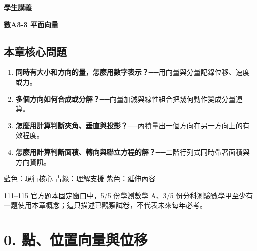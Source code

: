 \documentclass[11pt,a4paper]{article}
\providecommand{\tightlist}{%
  \setlength{\itemsep}{0pt}\setlength{\parskip}{0pt}}
\begin{document}
\begin{tcolorbox}[
  enhanced,colback=white,colframe=HandoutBlue,boxrule=1.1pt,arc=2mm,
  borderline west={3pt}{0pt}{HandoutBlue},left=5mm,right=4mm,top=4mm,bottom=4mm
]
{\sffamily\small\bfseries\color{HandoutBlue}學生講義}\par
{\sffamily\bfseries\LARGE\color{HandoutInk}數A3-3 平面向量}\par
\vspace{0.35em}{\large 把方向變成可運算的分量，再用內積與行列式讀角度和面積}\par
{}\par
{}\par
\end{tcolorbox}


\begin{HandoutLearningMap}

\subsection{本章核心問題}\label{ux672cux7ae0ux6838ux5fc3ux554fux984c}

\begin{enumerate}
\def\labelenumi{\arabic{enumi}.}
\tightlist
\item
  \textbf{同時有大小和方向的量，怎麼用數字表示？}──用向量與分量記錄位移、速度或力。
\item
  \textbf{多個方向如何合成或分解？}──向量加減與線性組合把幾何動作變成分量運算。
\item
  \textbf{怎麼用計算判斷夾角、垂直與投影？}──內積量出一個方向在另一方向上的有效程度。
\item
  \textbf{怎麼用計算判斷面積、轉向與聯立方程的解？}──二階行列式同時帶著面積與方向資訊。
\end{enumerate}

{藍色：現行核心}
{青綠：理解支援}
{紫色：延伸內容}

111--115 官方題本固定窗口中，5/5 份學測數學 A、3/5 份分科測驗數學甲至少有一題使用本章概念；這只描述已觀察試卷，不代表未來每年必考。

\end{HandoutLearningMap}

\section{0. 點、位置向量與位移}\label{ux9edeux4f4dux7f6eux5411ux91cfux8207ux4f4dux79fb}
\end{document}
